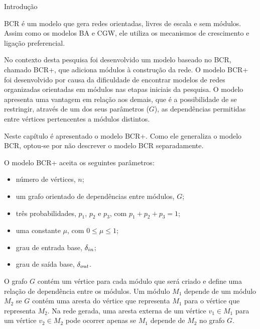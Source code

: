 \begin{section}{Introdução}

BCR é um modelo que gera redes orientadas, livres de escala e sem módulos. Assim como os modelos BA e CGW, ele utiliza os mecanismos de crescimento e ligação preferencial.

No contexto desta pesquisa foi desenvolvido um modelo baseado no BCR, chamado BCR+, que adiciona módulos à construção da rede. O modelo BCR+ foi desenvolvido por causa da dificuldade de encontrar modelos de redes organizadas orientadas em módulos nas etapas iniciais da pesquisa. O modelo apresenta uma vantagem em relação aos demais, que é a possibilidade de se restringir, através de um dos seus parâmetros ($G$), as dependências permitidas entre vértices pertencentes a módulos distintos.

Neste capítulo é apresentado o modelo BCR+. Como ele generaliza o modelo BCR, optou-se por não descrever o modelo BCR separadamente.

% 
	O modelo BCR+ aceita os seguintes parâmetros:

	\begin{itemize}
	\item número de vértices, $n$;
	\item um grafo orientado de dependências entre módulos, $G$;
	\item três probabilidades, $p_1$, $p_2$ e $p_3$, com $p_1 + p_2 + p_3 = 1$;
	\item uma constante $\mu$, com $0 \le \mu \le 1$;
	\item grau de entrada base, $\delta_{in}$;
	\item grau de saída base, $\delta_{out}$.
	\end{itemize}

	O grafo $G$ contém um vértice para cada módulo que será criado e define uma relação de dependência entre os módulos. Um módulo $M_1$ depende de um módulo $M_2$ se $G$ contém uma aresta do vértice que representa $M_1$ para o vértice que representa $M_2$. Na rede gerada, uma aresta externa de um vértice $v_1 \in M_1$ para um vértice $v_2 \in M_2$ pode ocorrer apenas se $M_1$ depende de $M_2$ no grafo $G$. %


\end{section}
